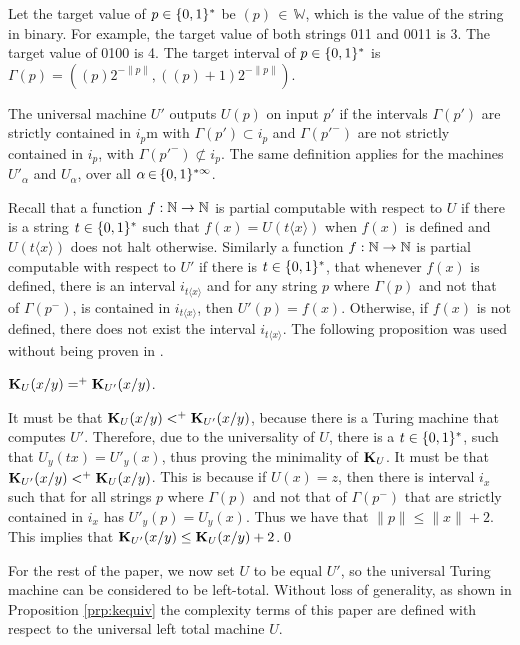 \documentclass[11pt]{article}\textwidth 6.5in\textheight 9in
\begin{document}
Let the target value of $p\in\{0,1\}^*$ be $(p)\,{\in}\,\mathbb{W}$, which is the value of the string in binary. For example, the target value of both strings 011 and 0011 is 3. The target value of 0100 is 4. The target interval of $p\in\{0,1\}^*$ is $\Gamma(p)=((p)2^{-\|p\|},((p){+}1)2^{-\|p\|})$.

The universal machine $U'$ outputs $U(p)$ on input $p'$ if the intervals $\Gamma(p')$ are strictly contained in $i_p$m with $\Gamma(p')\subset i_p$ and $\Gamma({p'}^{-})$ are not strictly contained in $i_p$, with $\Gamma({p'}^{-})\not\subset i_p$. The same definition applies for the machines $U'_\alpha$ and $U_\alpha$, over all $\alpha\,{\in}\,\{0,1\}^{*\infty}$. 

Recall that a function $f:\mathbb{N}\rightarrow\mathbb{N}$ is partial computable with respect to $U$ if there is a string $t\in\{0,1\}^*$ such that $f(x)=U(t\langle x\rangle)$ when $f(x)$ is defined and $U(t\langle x\rangle)$ does not halt otherwise. Similarly a function $f:\mathbb{N}\rightarrow\mathbb{N}$ is partial computable with respect to $U'$ if there is $t\in\{0,1\}^*$, that whenever $f(x)$ is defined, there is an interval $i_{t\langle x\rangle}$ and for any string $p$ where $\Gamma(p)$ and not that of $\Gamma(p^-)$, is contained in $i_{t\langle x\rangle}$, then $U'(p)=f(x)$. Otherwise, if $f(x)$ is not defined, there does not exist the interval $i_{t\langle x\rangle}$. The following proposition was used without being proven in \citep{Levin16}.

\begin{prp}
	${\mathbf K}_U(x/y)=^+{\mathbf K}_{U'}(x/y)$.
	\label{prp:kequiv}
\end{prp}
\begin{prf}
	It must be that ${\mathbf K}_U(x/y)<^+ {\mathbf K}_{U'}(x/y)$, because there is a Turing machine that computes $U'$. Therefore, due to the universality of $U$, there is a $t\in\{0,1\}^*$, such that $U_y(tx)=U'_y(x)$, thus proving the minimality of ${\mathbf K}_U$. It must be that ${\mathbf K}_{U'}(x/y)<^+ {\mathbf K}_U(x/y)$. This is because if $U(x)=z$, then there is interval $i_x$ such that for all strings  $p$ where $\Gamma(p)$ and not that of $\Gamma(p^-)$ that are strictly contained in $i_x$ has $U'_y(p)= U_y(x)$. Thus we have that $\|p\|\leq \|x\|+2$. This implies that ${\mathbf K}_{U'}(x/y)\leq {\mathbf K}_U(x/y)+2$.\qed
\end{prf}

For the rest of the paper, we now set $U$ to be equal $U'$, so the universal Turing machine can be considered to be left-total. Without loss of generality, as shown in Proposition \ref{prp:kequiv} the complexity terms of this paper are defined with respect to the universal left total machine $U$.
\end{document}
